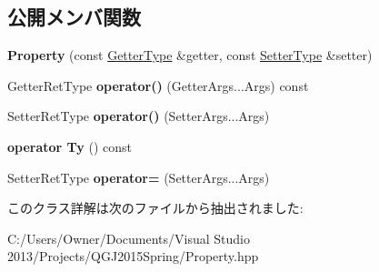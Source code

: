 \subsection*{公開メンバ関数}
\begin{DoxyCompactItemize}
\item 
{\bfseries Property} (const \hyperlink{classstd_1_1function}{Getter\+Type} \&getter, const \hyperlink{classstd_1_1function}{Setter\+Type} \&setter)\hypertarget{class_property_3_01_ty_00_01_getter_ret_type_07_getter_args_8_8_8_08_00_01_setter_ret_type_07_setter_args_8_8_8_08_4_a6f876eeec8d0072440d1db5c74f773fd}{}\label{class_property_3_01_ty_00_01_getter_ret_type_07_getter_args_8_8_8_08_00_01_setter_ret_type_07_setter_args_8_8_8_08_4_a6f876eeec8d0072440d1db5c74f773fd}

\item 
Getter\+Ret\+Type {\bfseries operator()} (Getter\+Args...\+Args) const \hypertarget{class_property_3_01_ty_00_01_getter_ret_type_07_getter_args_8_8_8_08_00_01_setter_ret_type_07_setter_args_8_8_8_08_4_a0e2170fb22f545d91b49c310a55986f6}{}\label{class_property_3_01_ty_00_01_getter_ret_type_07_getter_args_8_8_8_08_00_01_setter_ret_type_07_setter_args_8_8_8_08_4_a0e2170fb22f545d91b49c310a55986f6}

\item 
Setter\+Ret\+Type {\bfseries operator()} (Setter\+Args...\+Args)\hypertarget{class_property_3_01_ty_00_01_getter_ret_type_07_getter_args_8_8_8_08_00_01_setter_ret_type_07_setter_args_8_8_8_08_4_aa4e112eb3de265f8c6ba37dd312b0828}{}\label{class_property_3_01_ty_00_01_getter_ret_type_07_getter_args_8_8_8_08_00_01_setter_ret_type_07_setter_args_8_8_8_08_4_aa4e112eb3de265f8c6ba37dd312b0828}

\item 
{\bfseries operator Ty} () const \hypertarget{class_property_3_01_ty_00_01_getter_ret_type_07_getter_args_8_8_8_08_00_01_setter_ret_type_07_setter_args_8_8_8_08_4_ad78698987ae40c5a8ce2b0463d185820}{}\label{class_property_3_01_ty_00_01_getter_ret_type_07_getter_args_8_8_8_08_00_01_setter_ret_type_07_setter_args_8_8_8_08_4_ad78698987ae40c5a8ce2b0463d185820}

\item 
Setter\+Ret\+Type {\bfseries operator=} (Setter\+Args...\+Args)\hypertarget{class_property_3_01_ty_00_01_getter_ret_type_07_getter_args_8_8_8_08_00_01_setter_ret_type_07_setter_args_8_8_8_08_4_a6e7b4f601291868871a47fe98bc50a30}{}\label{class_property_3_01_ty_00_01_getter_ret_type_07_getter_args_8_8_8_08_00_01_setter_ret_type_07_setter_args_8_8_8_08_4_a6e7b4f601291868871a47fe98bc50a30}

\end{DoxyCompactItemize}


このクラス詳解は次のファイルから抽出されました\+:\begin{DoxyCompactItemize}
\item 
C\+:/\+Users/\+Owner/\+Documents/\+Visual Studio 2013/\+Projects/\+Q\+G\+J2015\+Spring/Property.\+hpp\end{DoxyCompactItemize}
